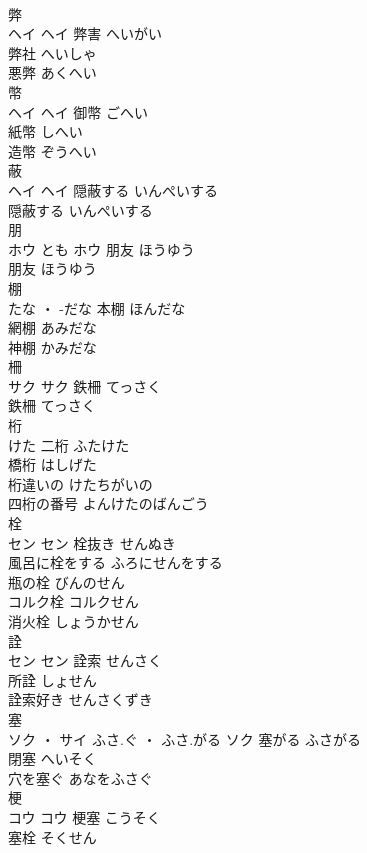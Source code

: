\documentclass[8pt]{extreport}
\begin{document}
\begin{CJK}{UTF8}{min}
\\	弊	
\\	ヘイ		ヘイ	弊害	へいがい	
\\	弊社	へいしゃ	
\\	悪弊	あくへい	
\\	幣	
\\	ヘイ		ヘイ	御幣	ごへい	
\\	紙幣	しへい	
\\	造幣	ぞうへい	
\\	蔽	
\\	ヘイ		ヘイ	隠蔽する	いんぺいする	
\\	隠蔽する	いんぺいする	
\\	朋	
\\	ホウ	とも	ホウ	朋友	ほうゆう	
\\	朋友	ほうゆう	
\\	棚	
\\	たな ・ -だな		本棚	ほんだな	
\\	網棚	あみだな	
\\	神棚	かみだな	
\\	柵	
\\	サク		サク	鉄柵	てっさく	
\\	鉄柵	てっさく	
\\	桁	
\\	けた		二桁	ふたけた	
\\	橋桁	はしげた	
\\	桁違いの	けたちがいの	
\\	四桁の番号	よんけたのばんごう	
\\	栓	
\\	セン		セン	栓抜き	せんぬき	
\\	風呂に栓をする	ふろにせんをする	
\\	瓶の栓	びんのせん	
\\	コルク栓	コルクせん	
\\	消火栓	しょうかせん	
\\	詮	
\\	セン		セン	詮索	せんさく	
\\	所詮	しょせん	
\\	詮索好き	せんさくずき	
\\	塞	
\\	ソク ・ サイ	ふさ.ぐ ・ ふさ.がる	ソク	塞がる	ふさがる	
\\	閉塞	へいそく	
\\	穴を塞ぐ	あなをふさぐ	
\\	梗	
\\	コウ		コウ	梗塞	こうそく	
\\	塞栓	そくせん	

\end{CJK}
\end{document}
